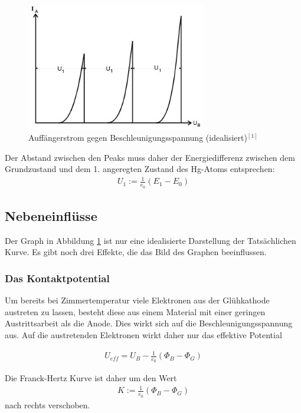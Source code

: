 \begin{figure}[H]
\includegraphics[width=0.7\textwidth]{pics/strom_spannung.jpeg}
\caption{Auffängerstrom gegen Beschleunigungsspannung (idealisiert)$^{[1]}$}
\label{pic_strom_spannung}
\end{figure}
Der Abstand zwischen den Peaks muss daher der Energiedifferenz zwischen dem Grundzustand und dem 1. angeregten Zustand des Hg-Atoms entsprechen:
\begin{align}
U_1:= \frac{1}{e_0}(E_1-E_0)
\end{align}
\subsection{Nebeneinflüsse}
Der Graph in Abbildung \ref{pic_strom_spannung} ist nur eine idealisierte Darstellung der Tatsächlichen Kurve. Es gibt noch drei Effekte, die das Bild des Graphen beeinflussen.
\subsubsection{Das Kontaktpotential}
\label{sec_kontakt}
Um bereits bei Zimmertemperatur viele Elektronen aus der Glühkathode austreten zu lassen, besteht diese aus einem Material mit einer geringen Austrittsarbeit als die Anode. Dies wirkt sich auf die Beschleunigungsspannung aus. Auf die austretenden Elektronen wirkt daher nur das effektive Potential
\begin{formel}[H]
\begin{align}
U_{eff}= U_B - \frac{1}{e_0}(\Phi_B-\Phi_G)
\label{eq_ionisation}
\end{align}
\caption*{\small{$\Phi_G$ - Austrittsarbeit Glühdrat, $\Phi_B$ - Austrittsarbeit Beschleunigungselektrode}}
\end{formel}
Die Franck-Hertz Kurve ist daher um den Wert
\begin{align}
K:=\frac{1}{e_0}(\Phi_B-\Phi_G)
\end{align}
nach rechts verschoben.
